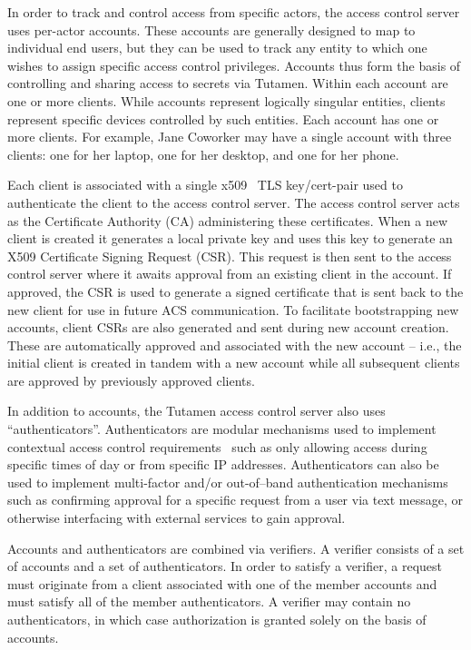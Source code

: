 In order to track and control access from specific actors, the access
control server uses per-actor accounts. These accounts are generally
designed to map to individual end users, but they can be used to track
any entity to which one wishes to assign specific access control
privileges. Accounts thus form the basis of controlling and sharing
access to secrets via Tutamen. Within each account are one or more
clients. While accounts represent logically singular entities, clients
represent specific devices controlled by such entities. Each account
has one or more clients. For example, Jane Coworker may have a single
account with three clients: one for her laptop, one for her desktop,
and one for her phone.

Each client is associated with a single x509~\cite{rfc5280} TLS
key/cert-pair used to authenticate the client to the access control
server. The access control server acts as the Certificate Authority
(CA) administering these certificates. When a new client is created it
generates a local private key and uses this key to generate an X509
Certificate Signing Request (CSR). This request is then sent to the
access control server where it awaits approval from an existing client
in the account. If approved, the CSR is used to generate a signed
certificate that is sent back to the new client for use in future ACS
communication. To facilitate bootstrapping new accounts, client CSRs
are also generated and sent during new account creation. These are
automatically approved and associated with the new account -- i.e.,
the initial client is created in tandem with a new account while all
subsequent clients are approved by previously approved clients.

In addition to accounts, the Tutamen access control server also uses
``authenticators''. Authenticators are modular mechanisms used to
implement contextual access control requirements~\cite{hulsebosch2005}
such as only allowing access during specific times of day or from
specific IP addresses. Authenticators can also be used to implement
multi-factor and/or out-of--band authentication mechanisms such as
confirming approval for a specific request from a user via text
message, or otherwise interfacing with external services to gain
approval.

Accounts and authenticators are combined via verifiers. A verifier
consists of a set of accounts and a set of authenticators. In order to
satisfy a verifier, a request must originate from a client associated
with one of the member accounts and must satisfy all of the member
authenticators. A verifier may contain no authenticators, in which
case authorization is granted solely on the basis of accounts.


